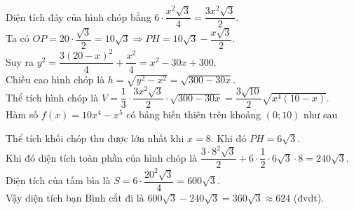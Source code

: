 \begin{ex}
{\begin{center}
\begin{tikzpicture}[line cap=round, line join=round, >=stealth, font=\footnotesize, scale=0.8]
		\end{tikzpicture}
	\end{center}
	Diện tích đáy của hình chóp bằng $6 \cdot \dfrac{x^2\sqrt{3}}{4}=\dfrac{3x^2\sqrt{3}}{2}$.\\
		Ta có $OP=20 \cdot \dfrac{\sqrt{3}}{2}=10\sqrt{3} \Rightarrow PH= 10\sqrt{3}-\dfrac{x\sqrt{3}}{2}$.\\
	Suy ra $y^2=\dfrac{3(20-x)^2}{4}+\dfrac{x^2}{4}=x^2-30x+300$.\\
	Chiều cao hình chóp là $h=\sqrt{y^2-x^2}=\sqrt{300-30x}$.\\
	Thể tích hình chóp là $V=\dfrac{1}{3} \cdot \dfrac{3x^2\sqrt{3}}{2} \cdot \sqrt{300-30x}=\dfrac{3\sqrt{10}}{2}\sqrt{x^4(10-x)}$.\\
	Hàm số $f(x)=10x^4-x^5$ có bảng biến thiên trên khoảng $(0;10)$ như sau
		\begin{center}
		\end{center}
	Thể tích khối chóp thu được lớn nhất khi $x=8$. Khi đó $PH=6\sqrt{3}$.\\
	Khi đó diện tích toàn phần của hình chóp là $\dfrac{3 \cdot 8^2\sqrt{3}}{2}+6 \cdot \dfrac{1}{2} \cdot 6\sqrt{3} \cdot 8=240\sqrt{3}$.\\
	Diện tích của tấm bìa là $S=6\cdot \dfrac{20^2\sqrt{3}}{4}=600\sqrt{3}$.\\
	Vậy diện tích bạn Bình cắt đi là $600\sqrt{3}-240\sqrt{3}=360\sqrt{3}\approx 624$ (đvdt).
	}
\end{ex}

